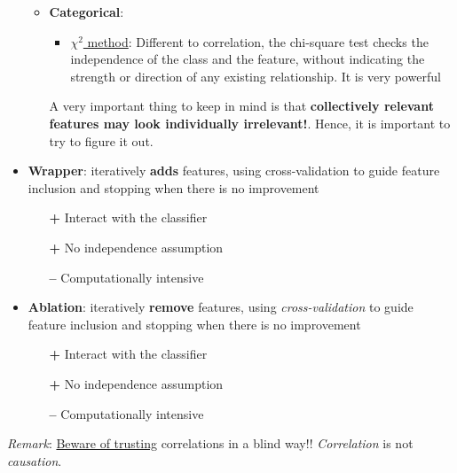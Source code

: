 \begin{itemize}
\begin{itemize}
    \item \textbf{Categorical}: 
    \begin{itemize}
      \item \href{https://en.wikipedia.org/wiki/Chi-squared_test}{$\chi^2$ method}: Different to correlation, the chi-square test checks the independence of the class and the feature, without indicating the strength or direction of any existing relationship. It is very powerful
    \end{itemize}
    A very important thing to keep in mind is that \textbf{collectively relevant features may look individually irrelevant!}. Hence, it is important to try to figure it out.
  \end{itemize}
  \item \textbf{Wrapper}: iteratively \textbf{adds} features, using cross-validation to guide feature inclusion and stopping when there is no improvement
  \begin{itemize}
    \item[{\bf +}] Interact with the classifier
    \item[{\bf +}] No independence assumption
    \item[{\bf --}] Computationally intensive
  \end{itemize}

  \item \textbf{Ablation}: iteratively \textbf{remove} features, using \emph{cross-validation} to guide feature inclusion and stopping when there is no improvement

  \begin{itemize}
    \item[{\bf +}] Interact with the classifier
    \item[{\bf +}] No independence assumption
    \item[{\bf --}] Computationally intensive
  \end{itemize}
\end{itemize}
  

\emph{Remark}: \href{http://www.tylervigen.com/spurious-correlations}{Beware of trusting} correlations in a blind way!! \emph{Correlation} is not \emph{causation}.

